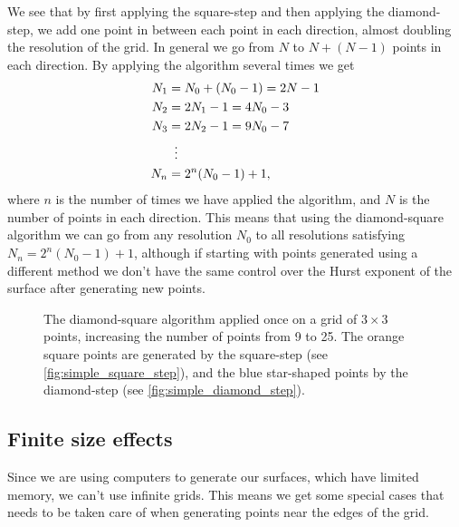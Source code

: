 We see that by first applying the square-step and then applying the diamond-step, we add one point in between each point in each direction, almost doubling the resolution of the grid. In general we go from $N$ to $N + (N-1)$ points in each direction. By applying the algorithm several times we get
\begin{align}
    N_1 &= N_0 + (N_0-1) = 2N - 1 \nonumber\\
    N_2 &= 2N_1 - 1 = 4N_0 - 3 \nonumber\\
    N_3 &= 2N_2 - 1 = 9N_0 - 7 \nonumber\\
    &\vdotswithin{=} \nonumber\\
    N_n &= 2^n(N_0-1) + 1, \label{eq:diamond_step_resolution}
\end{align}
where $n$ is the number of times we have applied the algorithm, and $N$ is the number of points in each direction. This means that using the diamond-square algorithm we can go from any resolution $N_0$ to all resolutions satisfying $N_n = 2^n(N_0 - 1) + 1$, although if starting with points generated using a different method we don't have the same control over the Hurst exponent of the surface after generating new points.
%
\begin{figure}[htpb]%
    \centering%
    \caption{%
        The diamond-square algorithm applied once on a grid of $3\times 3$ points, increasing the number of points from 9 to 25. The orange square points are generated by the square-step (see \cref{fig:simple_square_step}), and the blue star-shaped points by the diamond-step (see \cref{fig:simple_diamond_step}).%
    }%
    \label{fig:diamond_square_applied}%
\end{figure}%

\subsection{Finite size effects\label{sec:diamond_square_2d_finite}}
Since we are using computers to generate our surfaces, which have limited memory, we can't use infinite grids. This means we get some special cases that needs to be taken care of when generating points near the edges of the grid.

